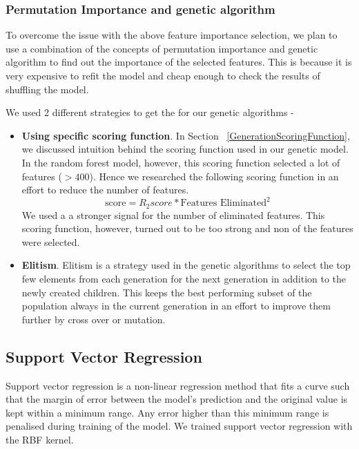 \documentclass[11pt]{article}
\begin{document}
\subsubsection{Permutation Importance and genetic algorithm}
To overcome the issue with the above feature importance selection, we plan to use a combination of the concepts of permutation importance and genetic algorithm to find out the importance of the selected features.
This is because it is very expensive to refit the model and cheap enough to check the results of shuffling the model.

We used 2 different strategies to get the for our genetic algorithms -
\begin{itemize}
\item \textbf{Using specific scoring function}.  In Section ~\ref{GenerationScoringFunction},  we discussed intuition behind the scoring function used in our genetic model.
In the random forest model,  however,  this scoring function selected a lot of features ($> 400$). Hence we researched the following scoring function in an effort to reduce the number of features. 
$$
\textrm{score} = R_2 score * \textrm{Features Eliminated}^2
$$
We used a a stronger signal for the number of eliminated features. This scoring function, however,  turned out to be too strong and non of the features were selected.
\item \textbf{Elitism}.  Elitism is a strategy used in the genetic algorithms to select the top few elements from each generation for the next generation in addition to the newly created children. This keeps the best performing subset of the population always in the current generation in an effort to improve them further by cross over or mutation.
\end{itemize}


\subsection{Support Vector Regression}
Support vector regression is a non-linear regression method that fits a curve such that the margin of error between the model's prediction and the original value is kept within a minimum range.
Any error higher than this minimum range is penalised during training of the model.
We trained support vector regression with the RBF kernel.
\end{document}
